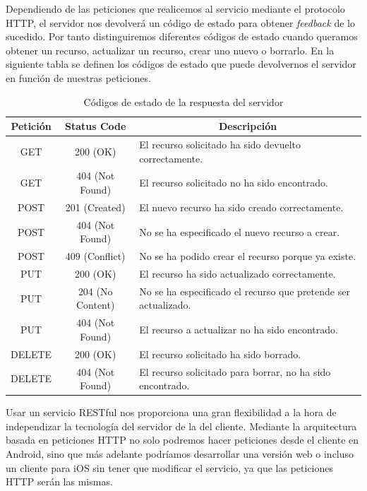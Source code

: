 Dependiendo de las peticiones que realicemos al servicio mediante el protocolo HTTP, el servidor nos devolverá un código de estado para obtener \textit{feedback} de lo sucedido. Por tanto distinguiremos diferentes códigos de estado cuando queramos obtener un recurso, actualizar un recurso, crear uno nuevo o borrarlo. En la siguiente tabla se definen los códigos de estado que puede devolvernos el servidor en función de nuestras peticiones.

\begin{table}[H]
\begin{tabular}{|c|c|m{7.5cm}|}
\hline
{\bf Petición} & {\bf Status Code} & \multicolumn{1}{c|}{{\bf Descripción}}                         \\ \hline
GET            & 200 (OK)          & El recurso solicitado ha sido devuelto correctamente.          \\ \hline
GET            & 404 (Not Found)   & El recurso solicitado no ha sido encontrado.                   \\ \hline
POST           & 201 (Created)     & El nuevo recurso ha sido creado correctamente.                 \\ \hline
POST           & 404 (Not Found)   & No se ha especificado el nuevo recurso a crear.                \\ \hline
POST           & 409 (Conflict)    & No se ha podido crear el recurso porque ya existe.             \\ \hline
PUT            & 200 (OK)          & El recurso ha sido actualizado correctamente.                  \\ \hline
PUT            & 204 (No Content)  & No se ha especificado el recurso que pretende ser actualizado. \\ \hline
PUT            & 404 (Not Found)   & El recurso a actualizar no ha sido encontrado.                 \\ \hline
DELETE         & 200 (OK)          & El recurso solicitado ha sido borrado.                         \\ \hline
DELETE         & 404 (Not Found)   & El recurso solicitado para borrar, no ha sido encontrado.      \\ \hline
\end{tabular}
\caption{Códigos de estado de la respuesta del servidor}
\label{fig:codeStateRestTable}
\end{table}

Usar un servicio RESTful nos proporciona una gran flexibilidad a la hora de independizar la tecnología del servidor de la del cliente. Mediante la arquitectura basada en peticiones HTTP no solo podremos hacer peticiones desde el cliente en Android, sino que más adelante podríamos desarrollar una versión web o incluso un cliente para iOS sin tener que modificar el servicio, ya que las peticiones HTTP serán las mismas.

